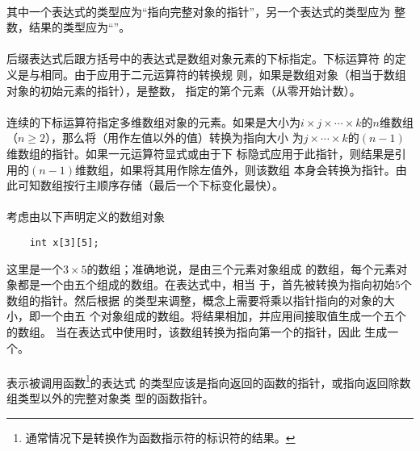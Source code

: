 {
\constraint
\paragraph{}
其中一个表达式的类型应为``指向完整对象的指针''，另一个表达式的类型应为
整数，结果的类型应为``''。

\semantic
\paragraph{}
后缀表达式后跟方括号\tm{[]}中的表达式是数组对象元素的下标指定。下标运算符\tm{[]}
的定义是与相同。由于应用于二元\tm{+}运算符的转换规
则，如果是数组对象（相当于数组对象的初始元素的指针），是整数，
指定的第个元素（从零开始计数）。

\paragraph{}
连续的下标运算符指定多维数组对象的元素。如果是大小为$i\times j\times\cdots
\times k$的$n$维数组（$n\ge 2$），那么将（用作左值以外的值）转换为指向大小
为$j\times\cdots\times k$的$(n-1)$维数组的指针。如果一元\tm{*}运算符显式或由于下
标隐式应用于此指针，则结果是引用的$(n-1)$维数组，如果将其用作除左值外，则该数组
本身会转换为指针。由此可知数组按行主顺序存储（最后一个下标变化最快）。

\paragraph{}
\ex 考虑由以下声明定义的数组对象
\begin{lstlisting}
    int x[3][5];
\end{lstlisting}
这里是一个$3\times 5$的数组；准确地说，是由三个元素对象组成
的数组，每个元素对象都是一个由五个组成的数组。在表达式中，相当
于，首先被转换为指向初始$5$个数组的指针。然后根据
的类型来调整，概念上需要将乘以指针指向的对象的大小，即一个由五
个对象组成的数组。将结果相加，并应用间接取值生成一个五个的数组。
当在表达式中使用时，该数组转换为指向第一个的指针，因此
生成一个。


\constraint
\paragraph{}
表示被调用函数\footnote{通常情况下是转换作为函数指示符的标识符的结果。}的表达式
的类型应该是指向返回的函数的指针，或指向返回除数组类型以外的完整对象类
型的函数指针。

}

